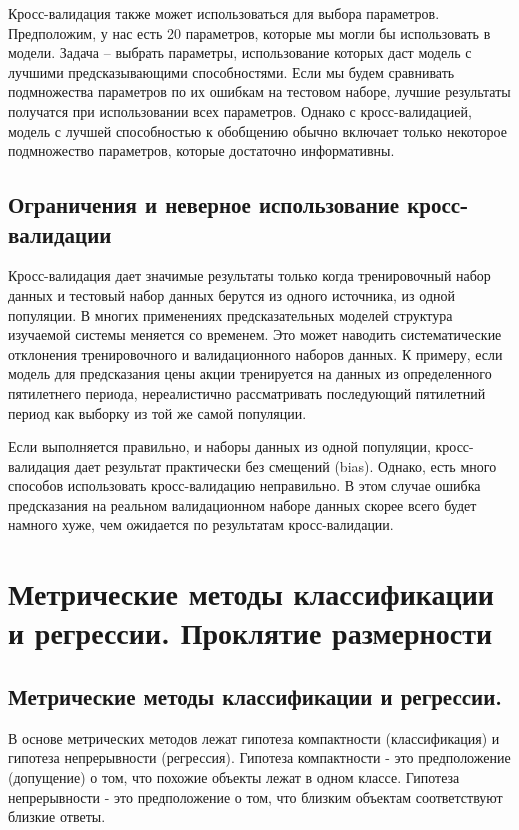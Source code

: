 \documentclass[a4paper, 12pt]{article}
\theoremstyle{plain} %
\theoremstyle{definition} %
\theoremstyle{remark} %
\begin{document}
Кросс-валидация также может использоваться для выбора параметров. Предположим, у нас есть 20 параметров, которые мы могли бы использовать в модели. Задача – выбрать параметры, использование которых даст модель с лучшими предсказывающими способностями. Если мы будем сравнивать подмножества параметров по их ошибкам на тестовом наборе, лучшие результаты получатся при использовании всех параметров. Однако с кросс-валидацией, модель с лучшей способностью к обобщению обычно включает только некоторое подмножество параметров, которые достаточно информативны.

\subsection{Ограничения и неверное использование кросс-валидации}

Кросс-валидация дает значимые результаты только когда тренировочный набор данных и тестовый набор данных берутся из одного источника, из одной популяции. В многих применениях предсказательных моделей структура изучаемой системы меняется со временем. Это может наводить систематические отклонения тренировочного и валидационного наборов данных. К примеру, если модель для предсказания цены акции тренируется на данных из определенного пятилетнего периода, нереалистично рассматривать последующий пятилетний период как выборку из той же самой популяции.

Если выполняется правильно, и наборы данных из одной популяции, кросс-валидация дает результат практически без смещений (bias). Однако, есть много способов использовать кросс-валидацию неправильно. В этом случае ошибка предсказания на реальном валидационном наборе данных скорее всего будет намного хуже, чем ожидается по результатам кросс-валидации.

\section{Метрические методы классификации и регрессии. Проклятие размерности}

\subsection{Метрические методы классификации и регрессии.}

В основе метрических методов лежат гипотеза компактности (классификация) и гипотеза непрерывности (регрессия). Гипотеза компактности - это предположение (допущение) о том, что похожие объекты лежат в одном классе. Гипотеза непрерывности - это предположение о том, что близким объектам соответствуют близкие ответы.
\end{document}
